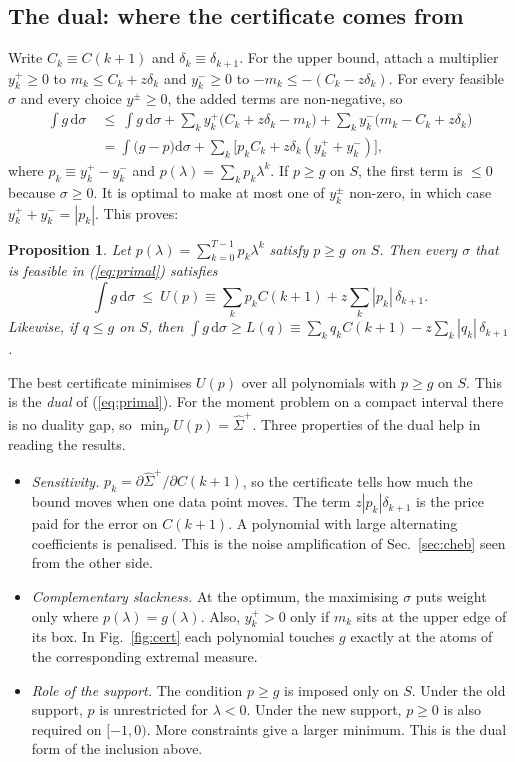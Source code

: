 \documentclass[11pt]{article}
\newcommand{\dd}{\mathrm{d}}
\newtheorem{prop}{Proposition}
\theoremstyle{remark}
\begin{document}
\subsection{The dual: where the certificate comes from}\label{sec:dual}
Write $C_k\equiv C(k+1)$ and $\delta_k\equiv\delta_{k+1}$. For the upper bound, attach a multiplier $y^+_k\ge0$ to $m_k\le C_k+z\delta_k$ and
$y^-_k\ge0$ to $-m_k\le-(C_k-z\delta_k)$. For every feasible $\sigma$ and every choice $y^\pm\ge0$, the added terms are non-negative, so
\begin{align}
 \int g\,\dd\sigma\ &\le\ \int g\,\dd\sigma+\sum_k y^+_k\big(C_k+z\delta_k-m_k\big)+\sum_k y^-_k\big(m_k-C_k+z\delta_k\big)\nonumber\\
 &=\int\big(g-p\big)\dd\sigma+\sum_k\big[p_kC_k+z\delta_k(y^+_k+y^-_k)\big],
\end{align}
where $p_k\equiv y^+_k-y^-_k$ and $p(\lambda)=\sum_kp_k\lambda^k$. If $p\ge g$ on $S$, the first term is $\le0$ because $\sigma\ge0$. It is optimal to make at most one of $y^\pm_k$ non-zero,
in which case $y^+_k+y^-_k=|p_k|$. This proves:
\begin{prop}\label{prop:cert}
Let $p(\lambda)=\sum_{k=0}^{T-1}p_k\lambda^k$ satisfy $p\ge g$ on $S$. Then every $\sigma$ that is feasible in (\ref{eq:primal}) satisfies
\begin{equation}
 \int g\,\dd\sigma\ \le\ U(p)\equiv\sum_kp_kC(k+1)+z\sum_k|p_k|\,\delta_{k+1}.
 \label{eq:cert}
\end{equation}
Likewise, if $q\le g$ on $S$, then $\int g\,\dd\sigma\ge L(q)\equiv\sum_kq_kC(k+1)-z\sum_k|q_k|\,\delta_{k+1}$.
\end{prop}
The best certificate minimises $U(p)$ over all polynomials with $p\ge g$ on $S$. This is the \emph{dual} of (\ref{eq:primal}). For the moment problem on a compact interval there is
no duality gap, so $\min_pU(p)=\hat\Sigma^+$. Three properties of the dual help in reading the results.
\begin{itemize}[leftmargin=*,itemsep=1pt]
\item \emph{Sensitivity.} $p_k=\partial\hat\Sigma^+/\partial C(k+1)$, so the certificate tells how much the bound moves when one data point moves. The term $z|p_k|\delta_{k+1}$ is the
      price paid for the error on $C(k+1)$. A polynomial with large alternating coefficients is penalised. This is the noise amplification of Sec.~\ref{sec:cheb} seen from the other side.
\item \emph{Complementary slackness.} At the optimum, the maximising $\sigma$ puts weight only where $p(\lambda)=g(\lambda)$. Also, $y^+_k>0$ only if $m_k$ sits at the upper edge of its box.
      In Fig.~\ref{fig:cert} each polynomial touches $g$ exactly at the atoms of the corresponding extremal measure.
\item \emph{Role of the support.} The condition $p\ge g$ is imposed only on $S$. Under the old support, $p$ is unrestricted for $\lambda<0$. Under the new support, $p\ge0$ is also required on $[-1,0)$.
      More constraints give a larger minimum. This is the dual form of the inclusion above.
\end{itemize}
\end{document}
